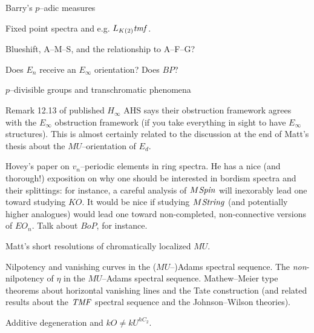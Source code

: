 Barry's $p$--adic measures

Fixed point spectra and e.g. $L_{K(2)} \mathit{tmf}$.

Blueshift, A--M--S, and the relationship to A--F--G?

Does $E_n$ receive an $E_\infty$ orientation?  Does $BP$?

$p$--divisible groups and transchromatic phenomena

Remark 12.13 of published $H_\infty$ AHS says their obstruction framework agrees with the $E_\infty$ obstruction framework (if you take everything in sight to have $E_\infty$ structures).  This is almost certainly related to the discussion at the end of Matt's thesis about the $MU$--orientation of $E_d$.

Hovey's paper on $v_n$--periodic elements in ring spectra.  He has a nice (and thorough!) exposition on why one should be interested in bordism spectra and their splittings: for instance, a careful analysis of $M\mathit{Spin}$ will inexorably lead one toward studying $KO$.  It would be nice if studying $M\mathit{String}$ (and potentially higher analogues) would lead one toward non-completed, non-connective versions of $EO_n$.  Talk about $BoP$, for instance.

Matt's short resolutions of chromatically localized $MU$.

Nilpotency and vanishing curves in the ($MU$--)Adams spectral sequence.  The \emph{non}-nilpotency of $\eta$ in the $MU$--Adams spectral sequence.  Mathew--Meier type theorems about horizontal vanishing lines and the Tate construction (and related results about the $\mathit{TMF}$ spectral sequence and the Johnson--Wilson theories).

Additive degeneration and $kO \ne kU^{hC_2}$.






